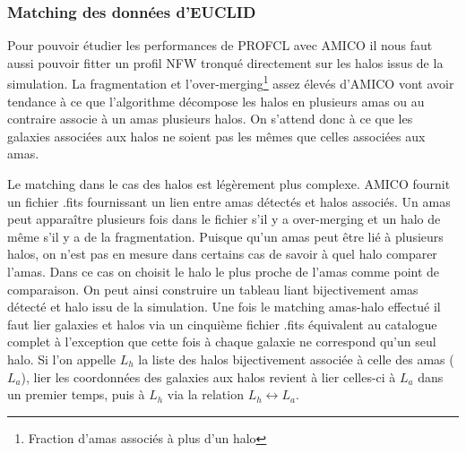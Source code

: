 \documentclass[a4paper,11pt]{article}
\numberwithin{equation}{section}
\begin{document}
      \subsubsection{Matching des données d'EUCLID}
        Pour pouvoir étudier les performances de PROFCL avec AMICO il nous faut aussi pouvoir fitter un profil NFW tronqué directement sur les halos issus de la simulation. La fragmentation et l'over-merging\footnote{Fraction d'amas associés à plus d'un halo} assez élevés d'AMICO vont avoir tendance à ce que l'algorithme décompose les halos en plusieurs amas ou au contraire associe à un amas plusieurs halos. On s'attend donc à ce que les galaxies associées aux halos ne soient pas les mêmes que celles associées aux amas.\par
        Le matching dans le cas des halos est légèrement plus complexe. AMICO fournit un fichier .fits fournissant un lien entre amas détectés et halos associés. Un amas peut apparaître plusieurs fois dans le fichier s'il y a over-merging et un halo de même s'il y a de la fragmentation. Puisque qu'un amas peut être lié à plusieurs halos, on n'est pas en mesure dans certains cas de savoir à quel halo comparer l'amas. Dans ce cas on choisit le halo le plus proche de l'amas comme point de comparaison. On peut ainsi construire un tableau liant bijectivement amas détecté et halo issu de la simulation.\newline
        Une fois le matching amas-halo effectué il faut lier galaxies et halos via un cinquième fichier .fits équivalent au catalogue complet à l'exception que cette fois à chaque galaxie ne correspond qu'un seul halo. Si l'on appelle $L_h$ la liste des halos bijectivement associée à celle des amas ($L_a$), lier les coordonnées des galaxies aux halos revient à lier celles-ci à $L_a$ dans un premier temps, puis à $L_h$ via la relation $L_h \leftrightarrow L_a$.     
         
\end{document}
